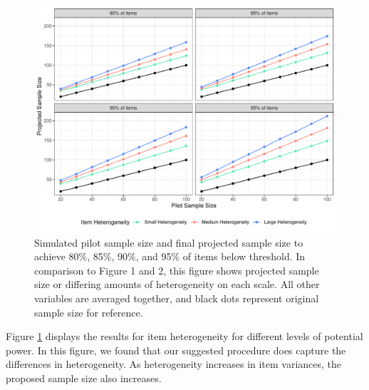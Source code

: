 \documentclass[
  man]{apa7}
\begin{document}
\begin{figure}
\centering
\includegraphics{manuscript_draft_files/figure-latex/scale-hetero-figure-1.pdf}
\caption{\label{fig:scale-hetero-figure}Simulated pilot sample size and final projected sample size to achieve 80\%, 85\%, 90\%, and 95\% of items below threshold. In comparison to Figure 1 and 2, this figure shows projected sample size or differing amounts of heterogeneity on each scale. All other variables are averaged together, and black dots represent original sample size for reference.}
\end{figure}

Figure \ref{fig:scale-hetero-figure} displays the results for item heterogeneity for different levels of potential power. In this figure, we found that our suggested procedure does capture the differences in heterogeneity. As heterogeneity increases in item variances, the proposed sample size also increases.
\end{document}

